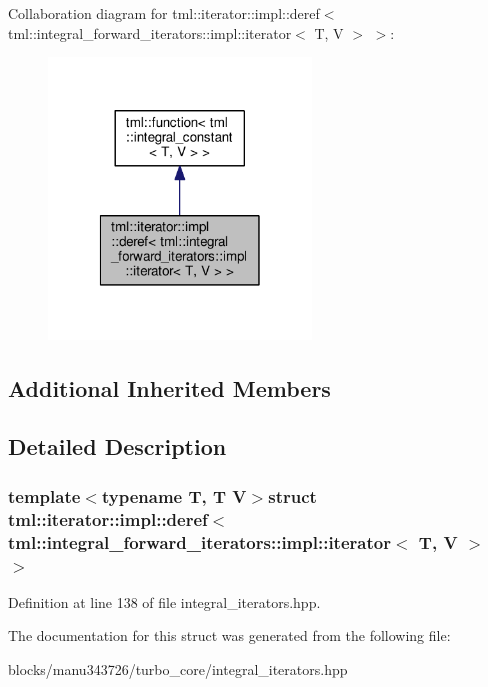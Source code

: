 Collaboration diagram for tml\+:\+:iterator\+:\+:impl\+:\+:deref$<$ tml\+:\+:integral\+\_\+forward\+\_\+iterators\+:\+:impl\+:\+:iterator$<$ T, V $>$ $>$\+:
\nopagebreak
\begin{figure}[H]
\begin{center}
\leavevmode
\includegraphics[width=198pt]{structtml_1_1iterator_1_1impl_1_1deref_3_01tml_1_1integral__forward__iterators_1_1impl_1_1iterat1b4e34e16b5f38604d3dd4e103addc89}
\end{center}
\end{figure}
\subsection*{Additional Inherited Members}


\subsection{Detailed Description}
\subsubsection*{template$<$typename T, T V$>$struct tml\+::iterator\+::impl\+::deref$<$ tml\+::integral\+\_\+forward\+\_\+iterators\+::impl\+::iterator$<$ T, V $>$ $>$}



Definition at line 138 of file integral\+\_\+iterators.\+hpp.



The documentation for this struct was generated from the following file\+:\begin{DoxyCompactItemize}
\item 
blocks/manu343726/turbo\+\_\+core/integral\+\_\+iterators.\+hpp\end{DoxyCompactItemize}
